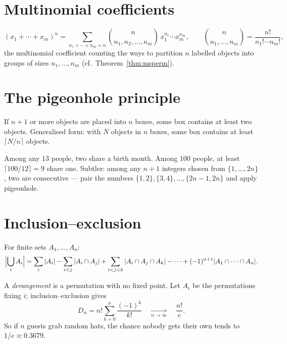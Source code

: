 \section{Multinomial coefficients}

\begin{theorem}
\[
(x_1 + \cdots + x_m)^{n}
= \sum_{n_1 + \cdots + n_m = n} \binom{n}{n_1, n_2, \ldots, n_m}\,
x_1^{n_1} \cdots x_m^{n_m},
\qquad
\binom{n}{n_1, \ldots, n_m} = \frac{n!}{n_1! \cdots n_m!},
\]
the multinomial coefficient counting the ways to partition $n$ labelled
objects into groups of sizes $n_1, \ldots, n_m$ (cf.\
Theorem~\ref{thm:msperm}).
\end{theorem}

\section{The pigeonhole principle}

\begin{theorem}\label{thm:pigeon}
If $n+1$ or more objects are placed into $n$ boxes, some box contains at
least two objects. Generalised form: with $N$ objects in $n$ boxes, some box
contains at least $\lceil N/n \rceil$ objects.
\end{theorem}

\begin{example}
Among any $13$ people, two share a birth month. Among $100$ people, at least
$\lceil 100/12 \rceil = 9$ share one. Subtler: among any $n+1$ integers
chosen from $\{1, \ldots, 2n\}$, two are consecutive --- pair the numbers
$\{1,2\},\{3,4\},\dots,\{2n-1,2n\}$ and apply pigeonhole.
\end{example}

\section{Inclusion--exclusion}

\begin{theorem}\label{thm:incexc}
For finite sets $A_1, \ldots, A_n$:
\[
\Bigl|\bigcup_{i} A_i\Bigr|
= \sum_i |A_i| - \sum_{i<j} |A_i \cap A_j|
+ \sum_{i<j<k} |A_i \cap A_j \cap A_k| - \cdots
+ (-1)^{n+1} |A_1 \cap \cdots \cap A_n|.
\]
\end{theorem}

\begin{example}[Derangements]\label{ex:derange}
A \emph{derangement} is a permutation with no fixed point. Let $A_i$ be the
permutations fixing $i$; inclusion--exclusion gives
\[
D_n = n!\sum_{k=0}^{n} \frac{(-1)^{k}}{k!}
\quad\xrightarrow[n \to \infty]{}\quad \frac{n!}{e}.
\]
So if $n$ guests grab random hats, the chance nobody gets their own tends to
$1/e \approx 0.3679$.
\end{example}

